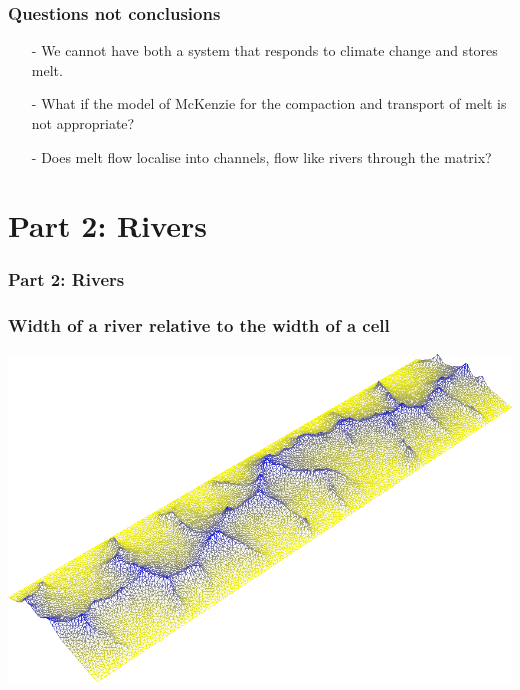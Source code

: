 \documentclass[aspectratio=169]{beamer}
\begin{document}
\begin{frame}
    \frametitle{Questions not conclusions}
    \begin{itemize}
        \item[-]{We cannot have both a system that responds to climate change and stores melt.}
        \item[-]{What if the model of McKenzie for the compaction and transport of melt is not appropriate?}
        \item[-]{Does melt flow localise into channels, flow like rivers through the matrix?}
    \end{itemize}
\end{frame}

\section{Part 2: Rivers}

{
\begin{frame}
    \frametitle{Part 2: Rivers}
\end{frame}
}

\begin{frame}
    \frametitle{Width of a river relative to the width of a cell}
    \centering
    \includegraphics[height=0.9\paperheight]{./figures/flem-grid.png}
\end{frame}
\end{document}
